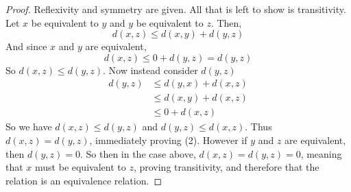 \documentclass[12pt, letterpaper]{article}
\begin{document}
\begin{proof}
  Reflexivity and symmetry are given. All that is left to show is transitivity. Let $x$ be equivalent to $y$ and $y$ be equivalent to $z$. Then,
  $$ d(x, z) \leq d(x, y) + d(y, z) $$
  And since $x$ and $y$ are equivalent,
  $$ d(x, z) \leq 0 + d(y, z) = d(y, z)$$
  So $d(x, z) \leq d(y, z)$. Now instead consider $d(y, z)$
  \begin{align*}
    d(y, z) &\leq d(y, x) + d(x, z)\\
    &\leq d(x, y) + d(x, z)\\
    &\leq 0 + d(x, z)
  \end{align*}
  So we have $d(x, z) \leq d(y, z)$ and $d(y, z) \leq d(x, z)$. Thus $d(x, z) = d(y, z)$, immediately proving (2). However if $y$ and $z$ are equivalent, then $d(y, z) = 0$. So then in the case above, $d(x, z) = d(y,z) = 0$, meaning that $x$ must be equivalent to $z$, proving transitivity, and therefore that the relation is an equivalence relation.
\end{proof}
\end{document}
